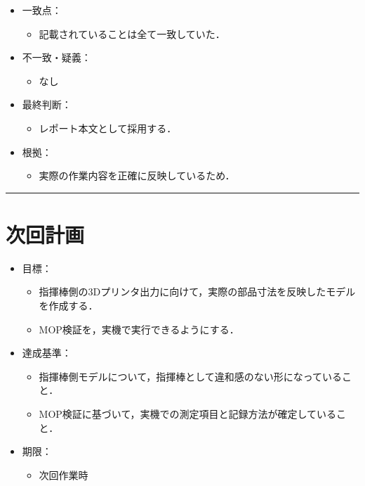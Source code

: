 \documentclass[uplatex,dvipdfmx,a4paper,11pt]{jsarticle}
\newcommand{\sectionrule}{\par\medskip\noindent\rule{\linewidth}{0.6pt}\par\medskip}
\begin{document}
\begin{itemize}
  \item 一致点：
    \begin{itemize}
      \item 記載されていることは全て一致していた．
    \end{itemize}
  \item 不一致・疑義：
    \begin{itemize}
      \item なし
    \end{itemize}
  \item 最終判断：
    \begin{itemize}
      \item レポート本文として採用する．
    \end{itemize}
  \item 根拠：
    \begin{itemize}
      \item 実際の作業内容を正確に反映しているため．
    \end{itemize}
\end{itemize}

\sectionrule

\section{次回計画}

\begin{itemize}
  \item 目標：
    \begin{itemize}
      \item 指揮棒側の3Dプリンタ出力に向けて，実際の部品寸法を反映したモデルを作成する．
      \item MOP検証を，実機で実行できるようにする．
    \end{itemize}
  \item 達成基準：
    \begin{itemize}
      \item 指揮棒側モデルについて，指揮棒として違和感のない形になっていること．
      \item MOP検証に基づいて，実機での測定項目と記録方法が確定していること．
    \end{itemize}
  \item 期限：
    \begin{itemize}
      \item 次回作業時
    \end{itemize}
\end{itemize}
\end{document}
